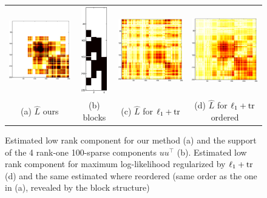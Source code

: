 \begin{figure}
\label{fig:gen}
\center
\begin{tabular}{cccc}
      \includegraphics[width=4cm]{fig/MILE_Lom}
  &   \includegraphics[height=3.8cm]{fig/MILE_blocks}
  &   \includegraphics[width=4cm]{fig/MILE_Lsl_not_ordered} 
  &   \includegraphics[width=4cm]{fig/MILE_Lsl_ordered} 
   \\   (a)  $\hat{L}$ ours  & (b) blocks &(c) $\hat{L}$ for $\ell_1+\rm tr$ &(d) $\hat{L}$ for $\ell_1+\rm tr$ ordered  
\end{tabular}
\caption{Estimated low rank component for our method (a) and the support of the 4 rank-one 100-sparse components $uu^{\top}$  (b).  Estimated low rank component for maximum log-likelihood regularized by $\ell_1+\rm tr$ (d) and the same estimated where reordered (same order as the one in (a), revealed by the block structure) }
\end{figure}
